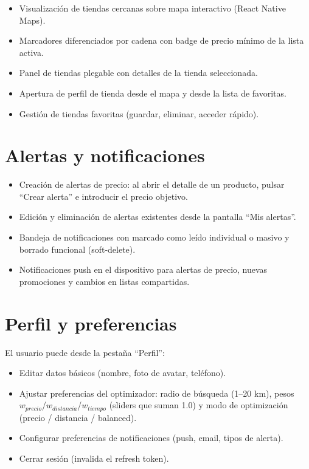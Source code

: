 \begin{itemize}
  \item Visualizaci\'on de tiendas cercanas sobre mapa interactivo (React Native Maps).
  \item Marcadores diferenciados por cadena con badge de precio m\'inimo de la lista activa.
  \item Panel de tiendas plegable con detalles de la tienda seleccionada.
  \item Apertura de perfil de tienda desde el mapa y desde la lista de favoritas.
  \item Gesti\'on de tiendas favoritas (guardar, eliminar, acceder r\'apido).
\end{itemize}

\section{Alertas y notificaciones}\label{sec:manual-notificaciones}

\begin{itemize}
  \item Creaci\'on de alertas de precio: al abrir el detalle de un producto, pulsar ``Crear
    alerta'' e introducir el precio objetivo.
  \item Edici\'on y eliminaci\'on de alertas existentes desde la pantalla ``Mis alertas''.
  \item Bandeja de notificaciones con marcado como le\'ido individual o masivo y borrado
    funcional (soft-delete).
  \item Notificaciones push en el dispositivo para alertas de precio, nuevas promociones y
    cambios en listas compartidas.
\end{itemize}

\section{Perfil y preferencias}\label{sec:manual-perfil}

El usuario puede desde la pesta\~na ``Perfil'':

\begin{itemize}
  \item Editar datos b\'asicos (nombre, foto de avatar, tel\'efono).
  \item Ajustar preferencias del optimizador: radio de b\'usqueda (1--20 km), pesos
    $w_{precio}$/$w_{distancia}$/$w_{tiempo}$ (sliders que suman 1.0) y modo de
    optimizaci\'on (precio / distancia / balanced).
  \item Configurar preferencias de notificaciones (push, email, tipos de alerta).
  \item Cerrar sesi\'on (invalida el refresh token).
\end{itemize}

